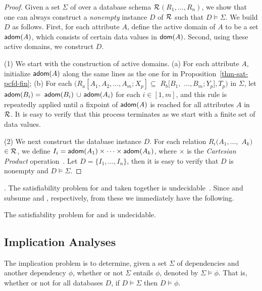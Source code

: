 \begin{proof}
 Given a set $\Sigma$ of \pCINDs over a
database schema $\cal R$$(R_1,\ldots,R_n)$, we show that one can always construct a
{\em nonempty} instance $D$ of $\cal R$ such that $D \models
\Sigma$.  We build $D$ as follows. First, for each attribute $A$, define the
active domain of $A$ to be a set ${\mathsf{adom}}(A)$, which consists of
certain data values in $\protect\mathsf{dom}(A)$. Second, using these active
domains, we construct $D$.

\sstab (1) We start with the construction of active domains. (a) For each
attribute $A$, initialize ${\mathsf{adom}}(A)$ along the same lines as the one
for \pCFDs in Proposition~\ref{thm-sat-pcfd-fin}; (b) For each
\pCIND $(R_a[A_1,A_2,\ldots,A_m;X_p] \subseteq$ $R_b[B_1,$
$\ldots,B_m;Y_p], T_p)$ in $\Sigma$, let ${\mathsf{adom}}(B_i)=$ ${\mathsf{adom}}(B_i)$
$\cup$ ${\mathsf{adom}}(A_i)$ for each $i\in [1,m]$, and this rule is
repeatedly applied until a fixpoint of ${\mathsf{adom}}(A)$ is reached for
all attributes $A$ in $\cal R$. 
%
It is easy to verify that this process
terminates as we start with a finite set of data values.

\sstab (2)  We next construct the database instance $D$. For each relation $R_i(A_1, \dots,$ $A_k)$ $\in
{\cal R}$, we define $I_i = {\mathsf{adom}}(A_1)\times \dots \times
{\ensuremath {\mathsf{adom}}}(A_k)$, where $\times$ is the {\em Cartesian Product}
operation~\cite{AbHuVi1995}. Let $D = \{I_1,\dots,I_n\}$, then it is easy to verify
that $D$ is nonempty and $D \models \Sigma$. 
\end{proof}


. The satisfiability problem for \CFDs
and \CINDs taken together is undecidable~\cite{CINDs}. Since \pCFDs and
\pCINDs subsume \CFDs and \CINDs, respectively, from these we
immediately have the following.

\vspace{-0.5ex}
\begin{cor}
\label{thm-sat-pcfd-pcind}The satisfiability problem for \pCFDs and
\pCINDs is undecidable.\eop
\end{cor}




\vspace{-3ex}
\subsection{Implication Analyses}

The implication problem is to determine, given a set $\Sigma$ of
dependencies and another dependency $\phi$, whether or not
$\Sigma$ entails $\phi$, denoted by $\Sigma\models\phi$. That is,
whether or not for all databases $D$, if $D\models\Sigma$ then
$D\models\phi$.

